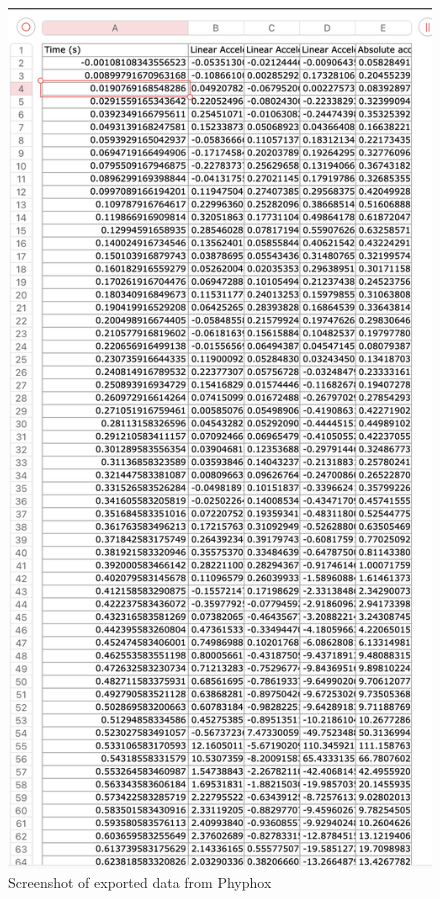 \documentclass[idxtotoc,hyperref,openany]{labbook} %
\begin{document}
\begin{figure}[H] %
\begin{center}
\includegraphics[width=.7\linewidth]{images/Lab.02/PhoneDropDataSet.png}
\end{center}
\caption{Screenshot of exported data from Phyphox}
\label{fig:Lab02-PhoneDropDataSet}
\end{figure}
\end{document}
